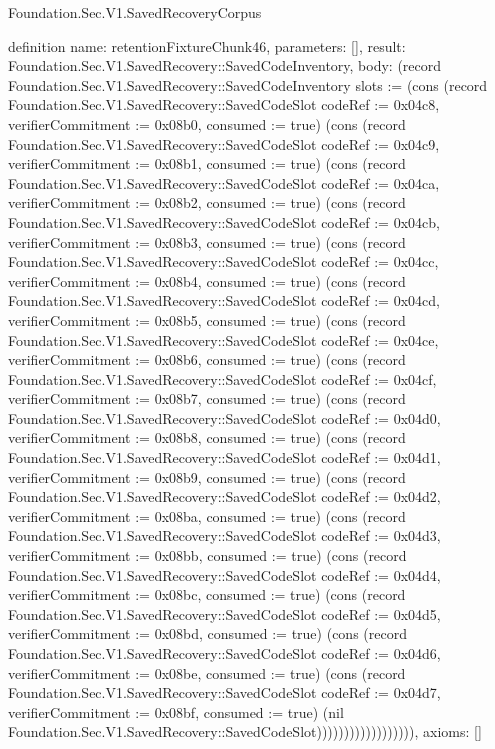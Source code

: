 \begin{lexlean}{Foundation.Sec.V1.SavedRecoveryCorpus}
\begin{semanticmodule}
definition{
  name: retentionFixtureChunk46,
  parameters: [],
  result: Foundation.Sec.V1.SavedRecovery::SavedCodeInventory,
  body: (record Foundation.Sec.V1.SavedRecovery::SavedCodeInventory {slots := (cons (record Foundation.Sec.V1.SavedRecovery::SavedCodeSlot {codeRef := 0x04c8, verifierCommitment := 0x08b0, consumed := true}) (cons (record Foundation.Sec.V1.SavedRecovery::SavedCodeSlot {codeRef := 0x04c9, verifierCommitment := 0x08b1, consumed := true}) (cons (record Foundation.Sec.V1.SavedRecovery::SavedCodeSlot {codeRef := 0x04ca, verifierCommitment := 0x08b2, consumed := true}) (cons (record Foundation.Sec.V1.SavedRecovery::SavedCodeSlot {codeRef := 0x04cb, verifierCommitment := 0x08b3, consumed := true}) (cons (record Foundation.Sec.V1.SavedRecovery::SavedCodeSlot {codeRef := 0x04cc, verifierCommitment := 0x08b4, consumed := true}) (cons (record Foundation.Sec.V1.SavedRecovery::SavedCodeSlot {codeRef := 0x04cd, verifierCommitment := 0x08b5, consumed := true}) (cons (record Foundation.Sec.V1.SavedRecovery::SavedCodeSlot {codeRef := 0x04ce, verifierCommitment := 0x08b6, consumed := true}) (cons (record Foundation.Sec.V1.SavedRecovery::SavedCodeSlot {codeRef := 0x04cf, verifierCommitment := 0x08b7, consumed := true}) (cons (record Foundation.Sec.V1.SavedRecovery::SavedCodeSlot {codeRef := 0x04d0, verifierCommitment := 0x08b8, consumed := true}) (cons (record Foundation.Sec.V1.SavedRecovery::SavedCodeSlot {codeRef := 0x04d1, verifierCommitment := 0x08b9, consumed := true}) (cons (record Foundation.Sec.V1.SavedRecovery::SavedCodeSlot {codeRef := 0x04d2, verifierCommitment := 0x08ba, consumed := true}) (cons (record Foundation.Sec.V1.SavedRecovery::SavedCodeSlot {codeRef := 0x04d3, verifierCommitment := 0x08bb, consumed := true}) (cons (record Foundation.Sec.V1.SavedRecovery::SavedCodeSlot {codeRef := 0x04d4, verifierCommitment := 0x08bc, consumed := true}) (cons (record Foundation.Sec.V1.SavedRecovery::SavedCodeSlot {codeRef := 0x04d5, verifierCommitment := 0x08bd, consumed := true}) (cons (record Foundation.Sec.V1.SavedRecovery::SavedCodeSlot {codeRef := 0x04d6, verifierCommitment := 0x08be, consumed := true}) (cons (record Foundation.Sec.V1.SavedRecovery::SavedCodeSlot {codeRef := 0x04d7, verifierCommitment := 0x08bf, consumed := true}) (nil Foundation.Sec.V1.SavedRecovery::SavedCodeSlot)))))))))))))))))}),
  axioms: []
}


\end{semanticmodule}
\end{lexlean}
